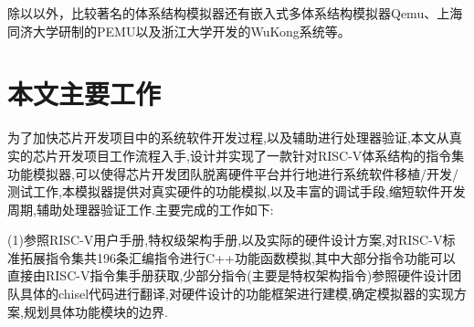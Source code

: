 

除以以外，比较著名的体系结构模拟器还有嵌入式多体系结构模拟器Qemu\cite{bellard2005qemu}、上海同济大学研制的PEMU\cite{huang}以及浙江大学开发的WuKong系统\cite{wukong}等。


\section{本文主要工作}
为了加快芯片开发项目中的系统软件开发过程,以及辅助进行处理器验证\cite{asaad2012cycle,chaix2019implementation},本文从真实的芯片开发项目工作流程入手,设计并实现了一款针对RISC-V体系结构的指令集功能模拟器,可以使得芯片开发团队脱离硬件平台并行地进行系统软件移植/开发/测试工作\cite{magnusson2002simics,ceze2003full,boh,varga2010omnet,许鹏2006一种应用于嵌入式系统中断控制},本模拟器提供对真实硬件的功能模拟,以及丰富的调试手段,缩短软件开发周期,辅助处理器验证工作.主要完成的工作如下:


(1)参照RISC-V用户手册,特权级架构手册,以及实际的硬件设计方案,对RISC-V标准拓展指令集共196条汇编指令进行C++功能函数模拟,其中大部分指令功能可以直接由RISC-V指令集手册获取,少部分指令(主要是特权架构指令)参照硬件设计团队具体的chisel代码进行翻译,对硬件设计的功能框架进行建模,确定模拟器的实现方案,规划具体功能模块的边界.


